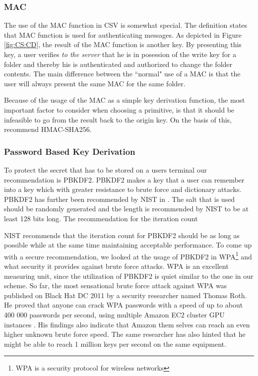 \documentclass[pdftex,english,10pt,b5paper,twoside]{book}
\begin{document}
\subsubsection{\ac{MAC}}
The use of the \ac{MAC} function in \ac{CSV} is somewhat special. The
definition states that MAC function is used for authenticating messages.  As
depicted in Figure \ref{fig:CS:CD}, the result of the \ac{MAC} function is
another key. By presenting this key, a user verifies \emph{to the server} that
he is in posession of the write key for a folder and thereby his is
authenticated and authorized to change the folder contents. The main difference
between the ``normal" use of a \ac{MAC} is that the user will always present
the same \ac{MAC} for the same folder.

Because of the usage of the \ac{MAC} as a simple key derivation function, the
most important factor to consider when choosing a primitive, is that it should
be infeasible to go from the result back to the origin key. On the basis of
this, \citet{schneier} recommend HMAC-SHA256.

\subsubsection{Password Based Key Derivation} 
\label{sec:PBKD}
To protect the secret that has to be stored on a users terminal our
recommendation is \ac{PBKDF2}. \ac{PBKDF2} makes a key that a user can remember
into a key which with greater resistance to brute force and dictionary attacks.
\ac{PBKDF2} has further been recommended by \ac{NIST} in \cite{pbkdf_nist}.
The salt that is used should be randomly generated and the length is
recommended by \ac{NIST} to be at least 128 bits long. The recommendation for
the iteration count 

\ac{NIST} recommends that the iteration count for \ac{PBKDF2} should be as long
as possible while at the same time maintaining acceptable
performance\cite{pbkdf_nist}. To come up with a secure recommendation, we
looked at the usage of \ac{PBKDF2} in WPA\footnote{WPA is a security protocol
for wireless networks} and what security it provides against brute force
attacks. WPA is an excellent measuring unit, since the utilization of
\ac{PBKDF2} is quiet similar to the one in our scheme. So far, the most
sensational brute force attack against WPA was published on Black Hat DC 2011
by a security researcher named Thomas Roth. He proved that anyone can crack WPA
passwords with a speed of up to about 400 000 passwords per second, using
multiple Amazon \ac{EC2} cluster \ac{GPU} instances \cite{rothwpa}. His
findings also indicate that Amazon them selves can reach an even higher unknown
brute force speed. The same researcher has also hinted that he might be able to
reach 1 million keys per second on the same equipment\cite{rothblog}.
\end{document}
